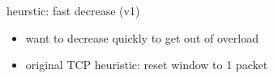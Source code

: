 \begin{frame}{heurstic: fast decrease (v1)}
    \begin{itemize}
    \item want to decrease quickly to get out of overload
    \item original TCP heuristic: reset window to 1 packet
    \end{itemize}
\end{frame}
